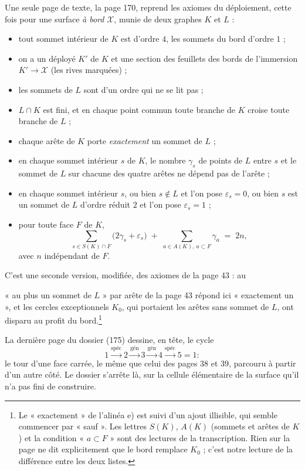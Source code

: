 \documentclass[11pt,a4paper]{article}
\begin{document}
Une seule page de texte, la page 170, reprend les axiomes du déploiement, cette
fois pour une surface \emph{à bord} $\mathcal{X}$, munie de deux graphes $K$ et
$L$ :
\begin{itemize}
\item[a)] tout sommet intérieur de $K$ est d'ordre $4$, les sommets du bord
d'ordre $1$ ;
\item[b)] on a un déployé $K'$ de $K$ et une section des feuillets des bords de
l'immersion $K' \to \mathcal{X}$ (les rives marquées) ;
\item[c)] les sommets de $L$ sont d'un ordre qui ne se lit pas ;
\item[d)] $L \cap K$ est fini, et en chaque point commun toute branche de $K$
croise toute branche de $L$ ;
\item[e)] chaque arête de $K$ porte \emph{exactement} un sommet de $L$ ;
\item[f)] en chaque sommet intérieur $s$ de $K$, le nombre $\gamma_s$ de points de
$L$ entre $s$ et le sommet de $L$ sur chacune des quatre arêtes ne dépend pas de
l'arête ;
\item[g)] en chaque sommet intérieur $s$, ou bien $s \notin L$ et l'on pose
$\varepsilon_s = 0$, ou bien $s$ est un sommet de $L$ d'ordre réduit $2$ et l'on
pose $\varepsilon_s = 1$ ;
\item[h)] pour toute face $F$ de $K$,
\[
\sum_{s \in S(K) \cap F} \bigl( 2\gamma_s + \varepsilon_s \bigr) \;+\;
\sum_{a \in A(K),\ a \subset F} \gamma_a \;=\; 2n ,
\]
avec $n$ indépendant de $F$.
\end{itemize}
C'est une seconde version, modifiée, des axiomes de la page 43 : au

« au plus un sommet de $L$ » par arête de la page 43 répond ici « exactement
un », et les cercles exceptionnels $K_0$, qui portaient les arêtes sans sommet de
$L$, ont disparu au profit du bord.\footnote{Le « exactement » de l'alinéa e)
est suivi d'un ajout illisible, qui semble commencer par « sauf ». Les lettres
$S(K)$, $A(K)$ (sommets et arêtes de $K$) et la condition « $a \subset F$ » sont
des lectures de la transcription. Rien sur la page ne dit explicitement que le
bord remplace $K_0$ ; c'est notre lecture de la différence entre les deux
listes.}

La dernière page du dossier (175) dessine, en tête, le cycle
\[
1 \xrightarrow{\text{spéc}} 2 \xrightarrow{\text{gén}} 3
\xrightarrow{\text{gén}} 4 \xrightarrow{\text{spéc}} 5 = 1 :
\]
le tour d'une face carrée, le même que celui des pages 38 et 39, parcouru à
partir d'un autre côté. Le dossier s'arrête là, sur la cellule élémentaire de la surface qu'il
n'a pas fini de construire.
\end{document}
